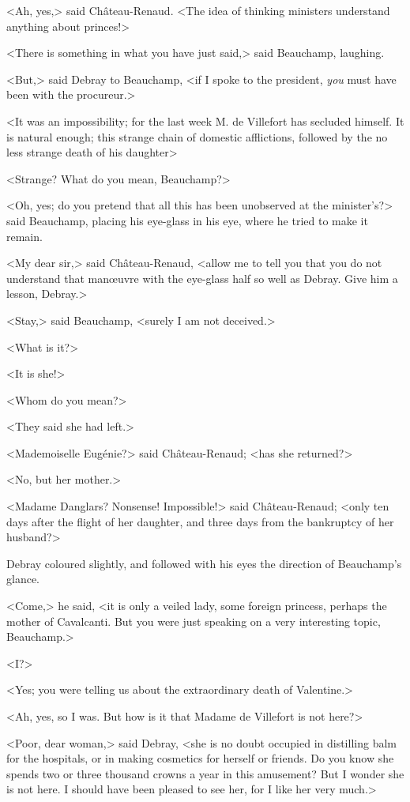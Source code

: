  <Ah, yes,> said Château-Renaud. <The idea of thinking ministers understand anything about princes!> 

 <There is something in what you have just said,> said Beauchamp, laughing. 

 <But,> said Debray to Beauchamp, <if I spoke to the president, \textit{you} must have been with the procureur.> 

 <It was an impossibility; for the last week M. de Villefort has secluded himself. It is natural enough; this strange chain of domestic afflictions, followed by the no less strange death of his daughter\longdash> 

 <Strange? What do you mean, Beauchamp?> 

 <Oh, yes; do you pretend that all this has been unobserved at the minister's?> said Beauchamp, placing his eye-glass in his eye, where he tried to make it remain. 

 <My dear sir,> said Château-Renaud, <allow me to tell you that you do not understand that manœuvre with the eye-glass half so well as Debray. Give him a lesson, Debray.> 

 <Stay,> said Beauchamp, <surely I am not deceived.> 

 <What is it?> 

 <It is she!> 

 <Whom do you mean?> 

 <They said she had left.> 

 <Mademoiselle Eugénie?> said Château-Renaud; <has she returned?> 

 <No, but her mother.> 

 <Madame Danglars? Nonsense! Impossible!> said Château-Renaud; <only ten days after the flight of her daughter, and three days from the bankruptcy of her husband?> 

 Debray coloured slightly, and followed with his eyes the direction of Beauchamp's glance. 

 <Come,> he said, <it is only a veiled lady, some foreign princess, perhaps the mother of Cavalcanti. But you were just speaking on a very interesting topic, Beauchamp.> 

 <I?> 

 <Yes; you were telling us about the extraordinary death of Valentine.> 

 <Ah, yes, so I was. But how is it that Madame de Villefort is not here?> 

 <Poor, dear woman,> said Debray, <she is no doubt occupied in distilling balm for the hospitals, or in making cosmetics for herself or friends. Do you know she spends two or three thousand crowns a year in this amusement? But I wonder she is not here. I should have been pleased to see her, for I like her very much.> 

